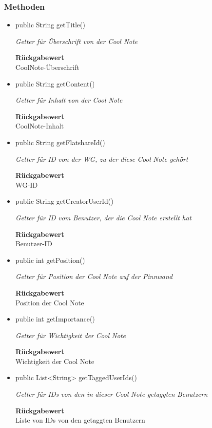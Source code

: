 \documentclass[a4paper]{scrreprt}
\begin{document}
        \subsubsection{Methoden}
        \begin{itemize}
        	\item{public String getTitle()}
        	
        	\textit{Getter für Überschrift von der Cool Note}
        	
        	
        	
        	\textbf{Rückgabewert} \\
        	CoolNote-Überschrift        \item{public String getContent()}
        	
        	\textit{Getter für Inhalt von der Cool Note}
        	
        	
        	
        	\textbf{Rückgabewert} \\
        	CoolNote-Inhalt        \item{public String getFlatshareId()}
        	
        	\textit{Getter für ID von der WG, zu der diese Cool Note gehört}
        	
        	
        	
        	\textbf{Rückgabewert} \\
        	WG-ID        \item{public String getCreatorUserId()}
        	
        	\textit{Getter für ID vom Benutzer, der die Cool Note erstellt hat}
        	
        	
        	
        	\textbf{Rückgabewert} \\
        	Benutzer-ID        \item{public int getPosition()}
        	
        	\textit{Getter für Position der Cool Note auf der Pinnwand}
        	
        	
        	
        	\textbf{Rückgabewert} \\
        	Position der Cool Note        \item{public int getImportance()}
        	
        	\textit{Getter für Wichtigkeit der Cool Note}
        	
        	
        	
        	\textbf{Rückgabewert} \\
        	Wichtigkeit der Cool Note        \item{public List<String> getTaggedUserIds()}
        	
        	\textit{Getter für IDs von den in dieser Cool Note getaggten Benutzern}
        	
        	
        	
        	\textbf{Rückgabewert} \\
        	Liste von IDs von den getaggten Benutzern
        \end{itemize}
\end{document}
